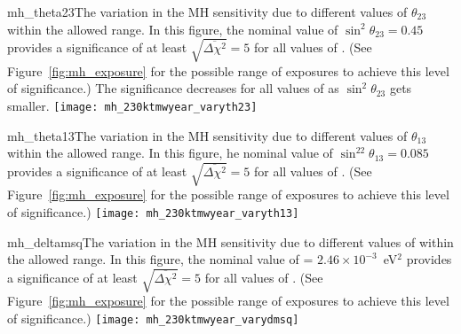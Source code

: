 \begin{cdrfigure}{mh_theta23}{The variation in the MH sensitivity due to different values of $\theta_{23}$ within the allowed range.  In this figure, the nominal value of $\sin^2\theta_{23} = 0.45$ provides a significance of at least $\sqrt{\overline{\Delta\chi^{2}}} = 5$ for all values of \deltacp. (See Figure~\ref{fig:mh_exposure} for the possible range of exposures to achieve this level of significance.) The significance decreases for all values of \deltacp as $\sin^2\theta_{23}$ gets smaller.}
 \texttt{[image: mh\_230ktmwyear\_varyth23]}
\end{cdrfigure}

\begin{cdrfigure}{mh_theta13}{The variation in the MH sensitivity due to different values of $\theta_{13}$ within the allowed range.  In this figure, he nominal value of $\sin^22\theta_{13} = 0.085$ provides a significance of at least $\sqrt{\overline{\Delta\chi^{2}}} = 5$ for all values of \deltacp.  (See Figure~\ref{fig:mh_exposure} for the possible range of exposures to achieve this level of significance.)}
 \texttt{[image: mh\_230ktmwyear\_varyth13]}
\end{cdrfigure}

\begin{cdrfigure}{mh_deltamsq}{The variation in the MH sensitivity due to different values of  within the allowed range.  In this figure, the nominal value of  = $2.46\times 10^{-3}$~eV$^2$ provides a significance of at least $\sqrt{\overline{\Delta\chi^{2}}} = 5$ for all values of \deltacp.  (See Figure~\ref{fig:mh_exposure} for the possible range of exposures to achieve this level of significance.)}
 \texttt{[image: mh\_230ktmwyear\_varydmsq]}
\end{cdrfigure}
 
